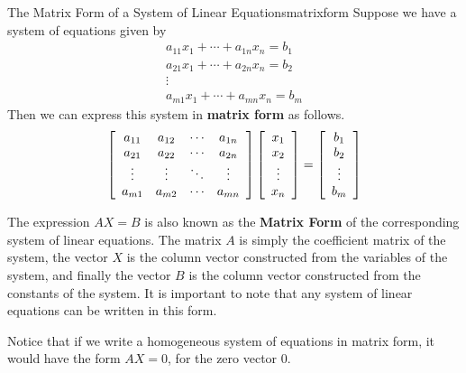 \begin{definition}{The Matrix Form of a System of Linear Equations}{matrixform}
Suppose we have a system of equations given by
\begin{equation*}
\begin{array}{c}
a_{11}x_{1}+\cdots +a_{1n}x_{n}=b_{1} \\
a_{21}x_{1}+ \cdots + a_{2n}x_{n} = b_{2} \\
\vdots \\
a_{m1}x_{1}+\cdots +a_{mn}x_{n}=b_{m}
\end{array}
\end{equation*}
Then we can express this system in \textbf{matrix form}  as follows.
\begin{equation*}
\left[
\begin{array}{cccc}
a_{11} & a_{12} & \cdots & a_{1n} \\
a_{21} & a_{22} & \cdots & a_{2n} \\
\vdots & \vdots & \ddots & \vdots \\
a_{m1} & a_{m2} & \cdots & a_{mn}
\end{array}
\right]
\left[
\begin{array}{c}
x_{1} \\
x_{2} \\
\vdots \\
x_{n}
\end{array}
\right]
=
\left[
\begin{array}{c}
b_{1}\\
b_{2}\\
\vdots \\
b_{m}
\end{array}
\right]
\end{equation*}
 
\end{definition}

The expression $AX=B$ is also known as the \textbf{Matrix Form} of the
corresponding system of linear equations.  The
matrix $A$ is simply the coefficient matrix of the system, the vector
$X$ is the column vector constructed from the variables of the system,
and finally the vector $B$ is the column vector constructed from the constants
of the system.  It is important to note that any system of linear
equations can be written in this form.

Notice that if we write a homogeneous system of equations in matrix form, it would have the form
$AX=0$, for the zero vector $0$.

